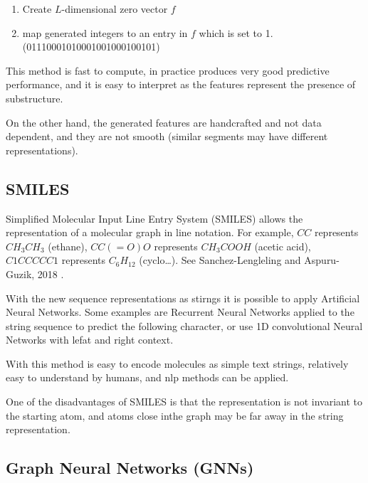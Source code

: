 \documentclass[b5paper]{report}
\begin{document}
\begin{enumerate}
\begin{enumerate}
\begin{figure}[h]
      \end{figure}
    \end{enumerate}
  \item Create $L$-dimensional zero vector $f$
  \item map generated integers to an entry in $f$ which is set to 1.
    (01110001010001001000100101)
\end{enumerate}


This method is fast to compute, in practice produces very good predictive
performance, and it is easy to interpret as the features represent the presence
of substructure.

On the other hand, the generated features are handcrafted and not data
dependent, and they are not smooth (similar segments may have different
representations).

\subsection{SMILES}

Simplified Molecular Input Line Entry System (SMILES) allows the representation
of a molecular graph in line notation. For example, $CC$ represents $CH_3CH_3$
(ethane), $CC(=O)O$ represents $CH_3COOH$ (acetic acid), $C1CCCCC1$ represents
$C_6H_{12}$ (cyclo\dots). See Sanchez-Lengleling and Aspuru-Guzik, 2018
\cite{gomez2018automatic}.

With the new sequence representations as stirngs it is possible to apply
Artificial Neural Networks. Some examples are Recurrent Neural Networks applied
to the string sequence to predict the following character, or use 1D
convolutional Neural Networks with lefat and right context.

With this method is easy to encode molecules as simple text strings, relatively
easy to understand by humans, and \acrfull{nlp} methods can be applied.

One of the disadvantages of SMILES is that the representation is not invariant
to the starting atom, and atoms close inthe graph may be far away in the string
representation.

\subsection{Graph Neural Networks (GNNs)}
\end{document}
